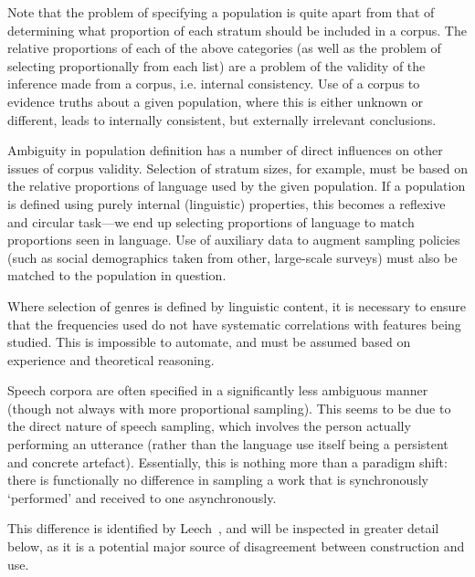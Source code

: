 Note that the problem of specifying a population is quite apart from that of determining what proportion of each stratum should be included in a corpus.  The relative proportions of each of the above categories (as well as the problem of selecting proportionally from each list) are a problem of the validity of the inference made from a corpus, i.e. internal consistency.  Use of a corpus to evidence truths about a given population, where this is either unknown or different, leads to internally consistent, but externally irrelevant conclusions.

Ambiguity in population definition has a number of direct influences on other issues of corpus validity. Selection of stratum sizes, for example, must be based on the relative proportions of language used by the given population.  If a population is defined using purely internal (linguistic) properties, this becomes a reflexive and circular task---we end up selecting proportions of language to match proportions seen in language.  Use of auxiliary data to augment sampling policies (such as social demographics taken from other, large-scale surveys) must also be matched to the population in question.

Where selection of genres is defined by linguistic content, it is necessary to ensure that the frequencies used do not have systematic correlations with features being studied.  This is impossible to automate, and must be assumed based on experience and theoretical reasoning.


Speech corpora are often specified in a significantly less ambiguous manner (though not always with more proportional sampling). This seems to be due to the direct nature of speech sampling, which involves the person actually performing an utterance (rather than the language use itself being a persistent and concrete artefact).  Essentially, this is nothing more than a paradigm shift: there is functionally no difference in sampling a work that is synchronously `performed' and received to one asynchronously.

This difference is identified by Leech~\cite{leech2006new}, and will be inspected in greater detail below, as it is a potential major source of disagreement between construction and use. %









